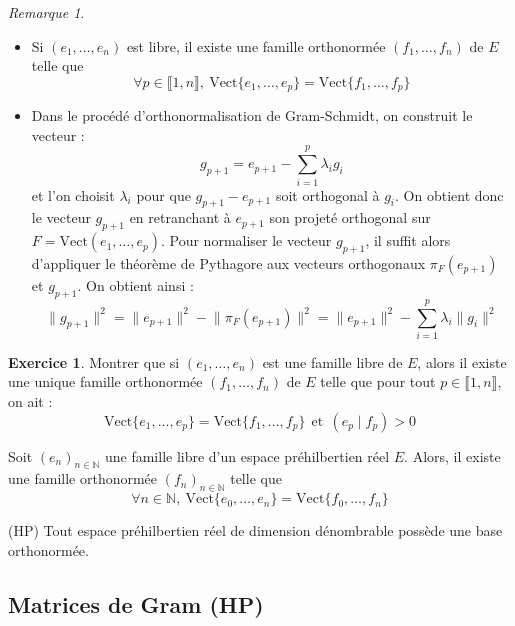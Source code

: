 \documentclass[french]{article}
\newcommand{\N}{\mathbb{N}}
\theoremstyle{plain}
\theoremstyle{definition}
\newtheorem{exo}{Exercice}
\theoremstyle{remark}
\newtheorem*{rmq}{Remarque}
\begin{document}
\begin{rmq}
	\begin{itemize}
		\item Si $(e_1,\ldots,e_n)$ est libre, il existe une famille orthonormée $(f_1,\ldots,f_n)$ de $E$ telle que $$\forall p\in\llbracket 1,n\rrbracket,\ \text{Vect}\{e_1,\ldots,e_p\}=\text{Vect}\{f_1,\ldots,f_p\}$$
		\item Dans le procédé d'orthonormalisation de Gram-Schmidt, on construit le vecteur : $$g_{p+1}=e_{p+1}-\sum_{i=1}^{p}\lambda_ig_i$$ et l'on choisit $\lambda_i$ pour que $g_{p+1}-e_{p+1}$ soit orthogonal à $g_i$. On obtient donc le vecteur $g_{p+1}$ en retranchant à $e_{p+1}$ son projeté orthogonal sur $F=\text{Vect}(e_1,\ldots,e_p)$. Pour normaliser le vecteur $g_{p+1}$, il suffit alors d'appliquer le théorème de Pythagore aux vecteurs orthogonaux $\pi_F(e_{p+1})$ et $g_{p+1}$. On obtient ainsi : $$\lVert g_{p+1}\rVert^2=\lVert e_{p+1}\rVert^2-\lVert\pi_F(e_{p+1})\rVert^2=\lVert e_{p+1}\rVert^2-\sum_{i=1}^{p}\lambda_i\lVert g_i\rVert^2$$
	\end{itemize}
\end{rmq}

\begin{exo}
	Montrer que si $(e_1,\ldots,e_n)$ est une famille libre de $E$, alors il existe une unique famille orthonormée $(f_1,\ldots,f_n)$ de $E$ telle que pour tout $p\in\llbracket1,n\rrbracket$, on ait : $$\text{Vect}\{e_1,\ldots,e_p\}=\text{Vect}\{f_1,\ldots,f_p\}\ \ \text{et}\ \ (e_p\mid f_p)>0$$
\end{exo}

\begin{thm}{}
	Soit $(e_n)_{n\in\N}$ une famille libre d'un espace préhilbertien réel $E$. Alors, il existe une famille orthonormée $(f_n)_{n\in\N}$ telle que $$\forall n\in\N,\ \text{Vect}\{e_0,\ldots,e_n\}=\text{Vect}\{f_0,\ldots,f_n\}$$
\end{thm}

\begin{thm}{(HP)}
	Tout espace préhilbertien réel de dimension dénombrable possède une base orthonormée.
\end{thm}

\subsection{Matrices de Gram (HP)}
\end{document}
